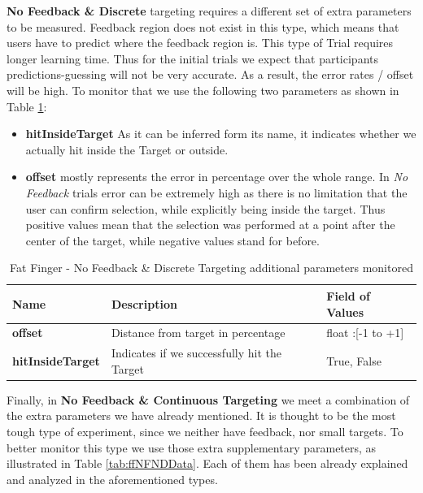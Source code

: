 \textbf{No Feedback \& Discrete} targeting requires a different set of extra parameters to be measured. Feedback region does not exist in this type, which means that users have to predict where the feedback region is. This type of Trial requires longer learning time. Thus for the initial trials we expect that participants predictions-guessing will not be very accurate. As a result, the error rates / offset will be high. To monitor that we use the following two parameters as shown in Table \ref{tab:ffNFDData}:
\begin{itemize}
	\item \textbf{hitInsideTarget} As it can be inferred form its name, it indicates whether we actually hit inside the Target or outside. 
	\item \textbf{offset} mostly represents the error in percentage over the whole range. In \emph{No Feedback} trials error can be extremely high as there is no limitation that the user can confirm selection, while explicitly being inside the target. Thus positive values mean that the selection was performed at a point after the center of the target, while negative values stand for before.
\end{itemize}


\begin{table}[H]
\centering
\begin{tabular}{l || l || l}
Name & Description & Field of Values  \\
\hline \hline
\textbf{offset} & Distance from target in percentage & float :[-1 to +1] \\
\textbf{hitInsideTarget} & Indicates if we successfully hit the Target & True, False
\end{tabular}
\caption{Fat Finger - No Feedback \& Discrete Targeting additional parameters monitored}
\label{tab:ffNFDData}
\end{table}

Finally, in \textbf{No Feedback \& Continuous Targeting} we meet a combination of the extra parameters we have already mentioned. It is thought to be the most tough type of experiment, since we neither have feedback, nor small targets. To better monitor this type we use those extra supplementary parameters, as illustrated in Table \ref{tab:ffNFNDData}. Each of them has been already explained and analyzed in the aforementioned types.



